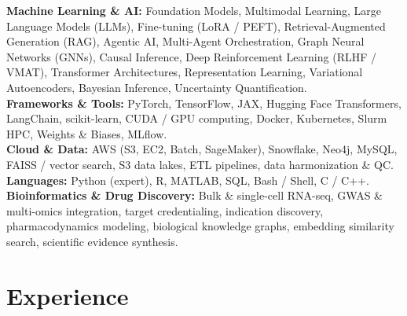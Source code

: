 \documentclass[11pt,letterpaper]{article}
\begin{document}
\textbf{Machine Learning \& AI:} Foundation Models, Multimodal Learning, Large Language Models (LLMs),
Fine-tuning (LoRA / PEFT), Retrieval-Augmented Generation (RAG), Agentic AI, Multi-Agent Orchestration,
Graph Neural Networks (GNNs), Causal Inference, Deep Reinforcement Learning (RLHF / VMAT),
Transformer Architectures, Representation Learning, Variational Autoencoders, Bayesian Inference,
Uncertainty Quantification.\\[3pt]
\textbf{Frameworks \& Tools:} PyTorch, TensorFlow, JAX, Hugging Face Transformers, LangChain,
scikit-learn, CUDA / GPU computing, Docker, Kubernetes, Slurm HPC, Weights \& Biases, MLflow.\\[3pt]
\textbf{Cloud \& Data:} AWS (S3, EC2, Batch, SageMaker), Snowflake, Neo4j, MySQL, FAISS / vector search,
S3 data lakes, ETL pipelines, data harmonization \& QC.\\[3pt]
\textbf{Languages:} Python (expert), R, MATLAB, SQL, Bash / Shell, C / C++.\\[3pt]
\textbf{Bioinformatics \& Drug Discovery:} Bulk \& single-cell RNA-seq, GWAS \& multi-omics integration,
target credentialing, indication discovery, pharmacodynamics modeling, biological knowledge graphs,
embedding similarity search, scientific evidence synthesis.

\section*{Experience}
\end{document}

